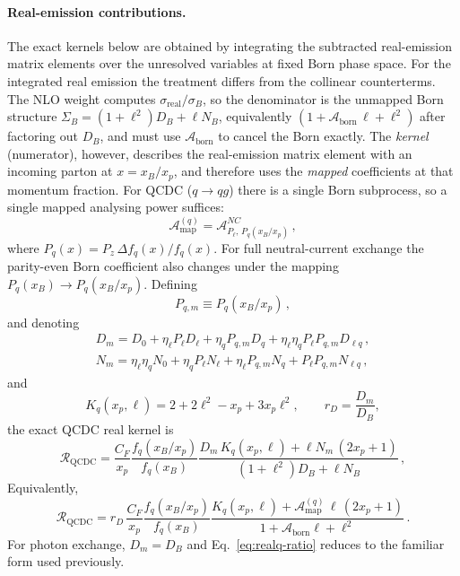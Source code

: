 \documentclass[a4paper,11pt]{article}
\begin{document}
\paragraph{Real-emission contributions.}
The exact kernels below are obtained by integrating the subtracted real-emission matrix elements over the unresolved variables at fixed Born phase space. For the integrated real emission the treatment differs from the collinear counterterms.  The NLO weight computes $\sigma_{\text{real}}/\sigma_B$, so the denominator is the unmapped Born structure $\Sigma_B=(1+\ell^2)D_B+\ell N_B$, equivalently $(1+\mathcal{A}_{\text{born}}\,\ell+\ell^2)$ after factoring out $D_B$, and must use $\mathcal{A}_{\text{born}}$ to cancel the Born exactly.  The \emph{kernel} (numerator), however, describes the real-emission matrix element with an incoming parton at $x=x_B/x_p$, and therefore uses the \emph{mapped} coefficients at that momentum fraction.  For QCDC ($q\to qg$) there is a single Born subprocess, so a single mapped analysing power suffices:
\begin{equation}
  \mathcal{A}_{\text{map}}^{(q)} = \mathcal{A}^{NC}_{P_\ell,\,P_q(x_B/x_p)}\,,
\label{eq:a-mapped-q}
\end{equation}
where $P_q(x)=P_z\,\Delta f_q(x)/f_q(x)$.
For full neutral-current exchange the parity-even Born coefficient also changes under the mapping $P_q(x_B)\to P_q(x_B/x_p)$. Defining
\begin{equation}
  P_{q,m}\equiv P_q(x_B/x_p)\,,
\end{equation}
and denoting
\begin{align}
  D_m=D_0+\eta_\ell P_\ell D_\ell+\eta_q P_{q,m}D_q+\eta_\ell\eta_q P_\ell P_{q,m}D_{\ell q}\,,\nonumber \\
  N_m=\eta_\ell\eta_q N_0+\eta_q P_\ell N_\ell+\eta_\ell P_{q,m}N_q+P_\ell P_{q,m}N_{\ell q}\,,
\end{align}
and
\begin{equation}
  K_q(x_p,\ell)=2+2\ell^2-x_p+3x_p\ell^2,\qquad
  r_D=\frac{D_m}{D_B},
\end{equation}
the exact QCDC real kernel is
\begin{equation}
  \mathcal{R}_{\text{QCDC}}
  =
  \frac{C_F}{x_p}\frac{f_q(x_B/x_p)}{f_q(x_B)}
  \frac{D_m\,K_q(x_p,\ell)+\ell N_m\,(2x_p+1)}
       {(1+\ell^2)D_B+\ell N_B}\,,
  \label{eq:realq-exact}
\end{equation}
Equivalently,
\begin{equation}
  \mathcal{R}_{\text{QCDC}}
  =
  r_D\,
  \frac{C_F}{x_p}\frac{f_q(x_B/x_p)}{f_q(x_B)}
  \frac{K_q(x_p,\ell)+\mathcal{A}_{\text{map}}^{(q)}\,\ell\,(2x_p+1)}
       {1+\mathcal{A}_{\text{born}}\ell+\ell^2}\,.
  \label{eq:realq-ratio}
\end{equation}
For photon exchange, $D_m=D_B$ and Eq.~\eqref{eq:realq-ratio} reduces to the familiar form used previously.
\end{document}

